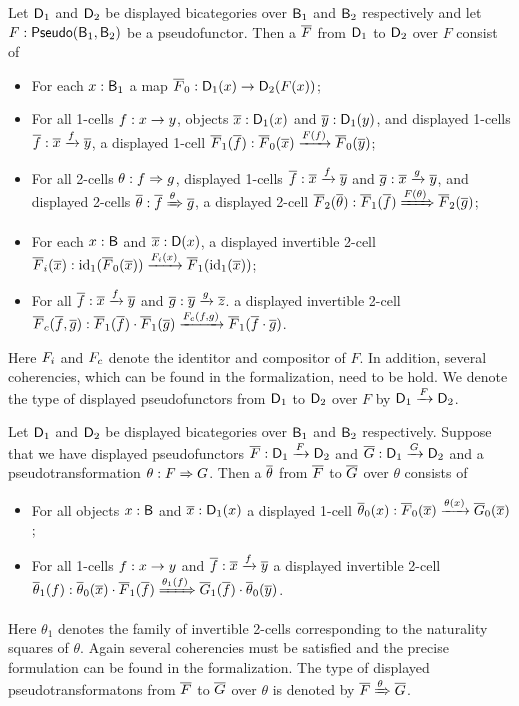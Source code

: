 \begin{definition}
Let $\D_1$ and $\D_2$ be displayed bicategories over $\B_1$ and $\B_2$ respectively and let $F : \pseudo(\B_1, \B_2)$ be a pseudofunctor.
Then a  $\FF$ from $\D_1$ to $\D_2$ over $F$ consist of
\begin{itemize}
	\item For each $x : \B_1$ a map $\FF_0 : \D_1(x) \rightarrow \D_2(F(x))$;
	\item For all 1-cells $f : x \onecell y$, objects $\xx : \D_1(x)$ and $\yy : \D_1(y)$,
	and displayed 1-cells $\ff : \dmor{\xx}{\yy}{f}$, a displayed 1-cell $\FF_1(\ff) :  \dmor{\FF_0(\xx)}{\FF_0(\yy)}{F(f)}$;
	\item For all 2-cells $\tc : f \twocell g$, displayed 1-cells $\ff : \dmor{\xx}{\yy}{f}$ and $\gg : \dmor{\xx}{\yy}{g}$,
	and displayed 2-cells $\dtc : \dtwo{\ff}{\gg}{\tc}$, a displayed 2-cell $\FF_2(\dtc) : \dtwo{\FF_1(\ff)}{\FF_2(\gg)}{F(\tc)}$;
	\item For each $x : \B$ and $\xx : \D(x)$, a displayed invertible 2-cell
	$\identitor{\FF}(\xx) : \dmor{\id_1(\FF_0(\xx))}{\FF_1(\id_1(\xx))}{\identitor{F}(x)}$;
	\item For all $\ff : \dmor{\xx}{\yy}{f}$ and $\gg : \dmor{\yy}{\zz}{g}$. a displayed invertible 2-cell
	$\compositor{\FF}(\ff, \gg) : \dmor{\FF_1(\ff) \cdot \FF_1(\gg)}{\FF_1(\ff \cdot \gg)}{\compositor{F}(f, g)}$.
\end{itemize}
Here $\identitor{F}$ and $\compositor{F}$ denote the identitor and compositor of $F$.
In addition, several coherencies, which can be found in the formalization, need to be hold.
We denote the type of displayed pseudofunctors from $\D_1$ to $\D_2$ over $F$ by $\disppsfun{\D_1}{\D_2}{F}$.
\end{definition}

\begin{definition}
Let $\D_1$ and $\D_2$ be displayed bicategories over $\B_1$ and $\B_2$ respectively.
Suppose that we have displayed pseudofunctors $\FF : \disppsfun{\D_1}{\D_2}{F}$ and $\GG : \disppsfun{\D_1}{\D_2}{G}$
and a pseudotransformation $\theta : \pstrans{F}{G}$.
Then a  $\thetatheta$ from $\FF$ to $\GG$ over $\theta$ consists of
\begin{itemize}
	\item For all objects $x : \B$ and $\xx : \D_1(x)$ a displayed 1-cell $\thetatheta_0(x) : \dmor{\FF_0(\xx)}{\GG_0(\xx)}{\theta(x)}$;
	\item For all 1-cells $f : x \onecell y$ and $\ff : \dmor{\xx}{\yy}{f}$ a displayed invertible 2-cell
	$\thetatheta_1(f) : \dtwo{\thetatheta_0(\xx) \cdot \FF_1(\ff)}{\GG_1(\ff) \cdot \thetatheta_0(\yy)}{\theta_1(f)}$.
\end{itemize}
Here $\theta_1$ denotes the family of invertible 2-cells corresponding to the naturality squares of $\theta$.
Again several coherencies must be satisfied and the precise formulation can be found in the formalization.
The type of displayed pseudotransformatons from $\FF$ to $\GG$ over $\theta$ is denoted by $\disppstrans{\FF}{\GG}{\theta}$.
\end{definition}

